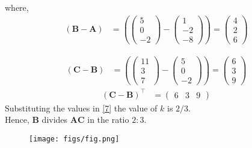 \documentclass[12pt]{article}
\let\vec\mathbf
\providecommand{\brak}[1]{\ensuremath{\left(#1\right)}}
\newcommand{\myvec}[1]{\ensuremath{\begin{pmatrix}#1\end{pmatrix}}}
\let\vec\mathbf
\begin{document}
\begin{enumerate}
			where,
			\begin{align}
				\brak{\vec{B-A}} &=
				\brak{\myvec{5\\0\\-2}-\myvec{1\\-2\\-8}} =
				\myvec{4\\2\\6}
			\end{align}
			
			\begin{align}
				\brak{\vec{C-B}} &=
				\brak{\myvec{11\\3\\7}-\myvec{5\\0\\-2}} =
				\myvec{6\\3\\9}
			\end{align}
			\begin{align*}
				\brak{\vec{C}-\vec{B}}^{\top} &=
				\myvec{6 & 3 & 9}
			\end{align*}
			Substituting the values in \eqref{7} the value of $k$ is $2/3$.
			\\    Hence, $\vec{B}$ divides $\vec{AC}$ in the ratio $2:3$.
	\begin{figure}[!h]
		\begin{center}
			\texttt{[image: figs/fig.png]}
		\end{center}
		\caption{}
		\label{fig:Fig1}
	\end{figure}


\end{enumerate}
\end{document}
